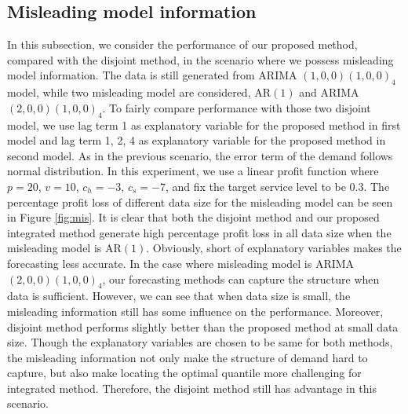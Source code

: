 \documentclass{article}
\begin{document}
\subsection{Misleading model information}
In this subsection, we consider the performance of our proposed method, compared with the disjoint method, in the scenario where we possess misleading model information. The data is still generated from ARIMA $(1,0,0)(1,0,0)_4$ model, while two misleading model are considered, AR$(1)$ and ARIMA $(2,0,0)(1,0,0)_4$. To fairly compare performance with those two disjoint model, we use lag term 1 as explanatory variable for the proposed method in first model and lag term 1, 2, 4 as explanatory variable for the proposed method in second model. As in the previous scenario, the error term of the demand follows normal distribution. In this experiment, we use a linear profit function where $p=20$, $v=10$, $c_h=-3$, $c_s=-7$, and fix the target service level to be 0.3. The percentage profit loss of different data size for the misleading model can be seen in Figure \ref{fig:mis}. It is clear that both the disjoint method and our proposed integrated method generate high percentage profit loss in all data size when the misleading model is AR$(1)$. Obviously, short of explanatory variables makes the forecasting less accurate. In the case where misleading model is ARIMA $(2,0,0)(1,0,0)_4$, our forecasting methods can capture the structure when data is sufficient. However, we can see that when data size is small, the misleading information still has some influence on the performance. Moreover, disjoint method performs slightly better than the proposed method at small data size. Though the explanatory variables are chosen to be same for both methods, the misleading information not only make the structure of demand hard to capture, but also make locating the optimal quantile more challenging for integrated method. Therefore, the disjoint method still has advantage in this scenario.
\end{document}
